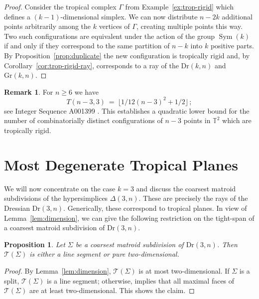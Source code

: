 \documentclass[11pt,a4paper]{amsart}
\DeclareMathOperator{\Sym}{Sym}
\newcommand{\Atightspan}[1]{{\mathcal{T}(#1)}}
\newcommand{\subdiv}{\Sigma}
\newcommand{\TT}{{\mathbb{T}}}
\newcommand{\Gr}[2]{{\mathrm{Gr}(#1,#2)}}
\newcommand{\Dr}[2]{{\mathrm{Dr}(#1,#2)}}
\theoremstyle{plain}
\newtheorem{proposition}[theorem]{Proposition}
\theoremstyle{definition}
\newtheorem{remark}[theorem]{Remark}
\begin{document}
\begin{proof}
  Consider the tropical complex $\Gamma$ from Example~\ref{ex:trop-rigid} which defines a $(k-1)$-dimensional
  simplex. We can now distribute $n-2k$ additional points arbitrarily among the $k$ vertices of $\Gamma$, creating
  multiple points this way. 
  Two such configurations are equivalent under the action of the group $\Sym(k)$ if and only if they
  correspond to the same partition of $n-k$ into $k$ positive parts. By Proposition~\ref{prop:duplicate} the new
  configuration is tropically rigid and, by Corollary~\ref{cor:trop-rigid-ray}, corresponds to a ray of the
  $\Dr kn$ and $\Gr kn$.
\end{proof}

\begin{remark}
  For $n\ge 6$ we have
  \[
  T(n-3,3) \ = \ \lfloor 1/12 (n-3)^2 + 1/2 \rfloor \, ;
  \]
  see Integer Sequence A001399 \cite{IntSeq}.  This establishes a quadratic lower bound for the number of
  combinatorially distinct configurations of $n-3$ points in $\TT^2$ which are tropically rigid.
\end{remark}

\section{Most Degenerate Tropical Planes}
\label{sec:planes}

We will now concentrate on the case $k=3$ and discuss the coarsest matroid subdivisions of the
hypersimplices $\Delta(3,n)$.  These are precisely the rays of the Dressian $\Dr 3n$.  Generically,
these correspond to tropical planes.  In view of Lemma~\ref{lem:dimension}, we can give the
following restriction on the tight-span of a coarsest matroid subdivision of $\Dr 3n$.

\begin{proposition}\label{prop:dimension-3}
  Let $\subdiv$ be a coarsest matroid subdivision of $\Dr 3n$. Then $\Atightspan \Sigma$ is
  either a line segment or pure two-dimensional.
\end{proposition}

\begin{proof}
  By Lemma~\ref{lem:dimension}, $\Atightspan \Sigma$ is at most two-dimensional. If $\subdiv$
  is a split,  $\Atightspan \Sigma$ is a line segment; otherwise,
  \cite[Cor.~5.3]{Herrmann09} implies that all maximal faces of $\Atightspan \Sigma$ are
  at least two-dimensional. This shows the claim.
\end{proof}
\end{document}
